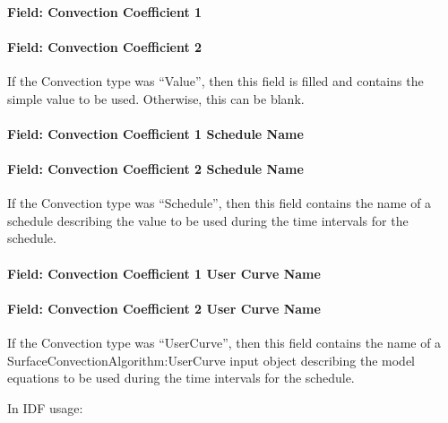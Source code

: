 \paragraph{Field: Convection Coefficient 1}\label{field-convection-coefficient-1}

\paragraph{Field: Convection Coefficient 2}\label{field-convection-coefficient-2}

If the Convection type was ``Value'', then this field is filled and contains the simple value to be used. Otherwise, this can be blank.

\paragraph{Field: Convection Coefficient 1 Schedule Name}\label{field-convection-coefficient-1-schedule-name}

\paragraph{Field: Convection Coefficient 2 Schedule Name}\label{field-convection-coefficient-2-schedule-name}

If the Convection type was ``Schedule'', then this field contains the name of a schedule describing the value to be used during the time intervals for the schedule.

\paragraph{Field: Convection Coefficient 1 User Curve Name}\label{field-convection-coefficient-1-user-curve-name}

\paragraph{Field: Convection Coefficient 2 User Curve Name}\label{field-convection-coefficient-2-user-curve-name}

If the Convection type was ``UserCurve'', then this field contains the name of a SurfaceConvectionAlgorithm:UserCurve input object describing the model equations to be used during the time intervals for the schedule.

In IDF usage:

